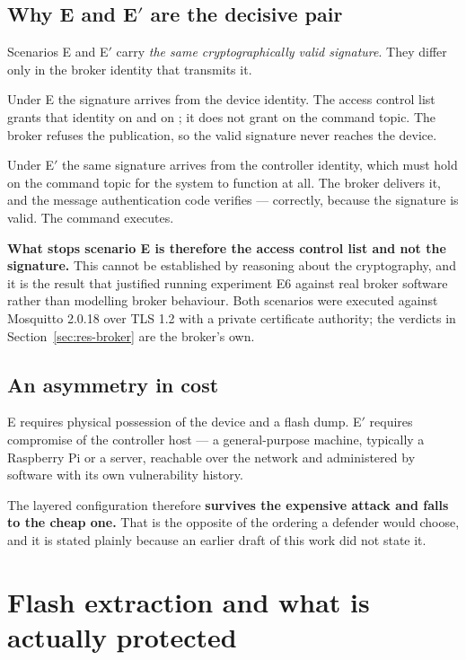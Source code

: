 \subsection{Why E and E$'$ are the decisive pair}\label{sec:sec-eprime}

Scenarios E and E$'$ carry \emph{the same cryptographically valid signature}. They differ only in
the broker identity that transmits it.

Under E the signature arrives from the device identity. The access control list grants that
identity  on  and  on ;
it does not grant  on the command topic. The broker refuses the publication, so the
valid signature never reaches the device.

Under E$'$ the same signature arrives from the controller identity, which must hold
 on the command topic for the system to function at all. The broker delivers it, and
the message authentication code verifies --- correctly, because the signature is valid. The
command executes.

\textbf{What stops scenario E is therefore the access control list and not the signature.} This
cannot be established by reasoning about the cryptography, and it is the result that justified
running experiment E6 against real broker software rather than modelling broker behaviour. Both
scenarios were executed against Mosquitto 2.0.18 over TLS 1.2 with a private certificate
authority; the verdicts in Section~\ref{sec:res-broker} are the broker's own.

\subsection{An asymmetry in cost}

E requires physical possession of the device and a flash dump. E$'$ requires compromise of the
controller host --- a general-purpose machine, typically a Raspberry Pi or a server, reachable
over the network and administered by software with its own vulnerability history.

The layered configuration therefore \textbf{survives the expensive attack and falls to the cheap
one.} That is the opposite of the ordering a defender would choose, and it is stated plainly
because an earlier draft of this work did not state it.

\section{Flash extraction and what is actually protected}\label{sec:sec-flashdump}

